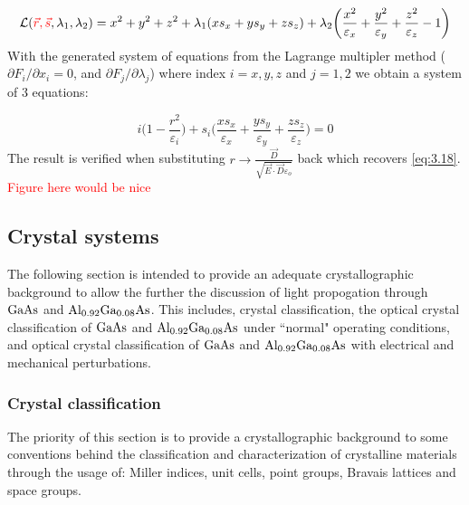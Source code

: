 \begin{equation}
\mathcal{L}(\textcolor{red}{\vec{r},\vec{s}},\lambda_1, \lambda_2) =
x^2 + y^2 + z^2 + \lambda_1 (xs_x + ys_y + zs_z) + \lambda_2 \bigg( \frac{x^2}{\varepsilon_x} + \frac{y^2}{\varepsilon_y} + \frac{z^2}{\varepsilon_z} - 1 \bigg)
\end{equation}
With the generated system of equations from the Lagrange multipler method ($\partial F_i/ \partial x_i = 0$, and $\partial F_j/ \partial \lambda_j$) where index $i =x,y,z$ and $j = 1,2$ we obtain a system of 3 equations:

\begin{equation}
i \bigg(1-\frac{r^2}{\varepsilon_{i}} \bigg) + s_{i} \bigg(\frac{x s_x}{\varepsilon_x} + \frac{y s_y}{\varepsilon_y} + \frac{z s_z}{\varepsilon_z} \bigg) = 0
\end{equation}
The result is verified when substituting $r \rightarrow \frac{\vec{D}}{\sqrt{\vec{E} \cdot \vec{D} \varepsilon_o}}$ back which recovers \ref{eq:3.18}.
\\
\textcolor{red}{Figure here would be nice}
\subsection{Crystal systems}
The following section is intended to provide an adequate crystallographic background to allow the further the discussion of light propogation through $\mathrm{GaAs}$ and $\mathrm{Al_{0.92}Ga_{0.08}As}$. This includes, crystal classification, the optical crystal classification of $\mathrm{GaAs}$ and $\mathrm{Al_{0.92}Ga_{0.08}As}$ under ``normal" operating conditions, and optical crystal classification of $\mathrm{GaAs}$  and $\mathrm{Al_{0.92}Ga_{0.08}As}$ with electrical and mechanical perturbations.

\subsubsection{Crystal classification}

The priority of this section is to provide a crystallographic background to some conventions behind the classification and characterization of crystalline materials through the usage of: Miller indices, unit cells, point groups, Bravais lattices and space groups.


